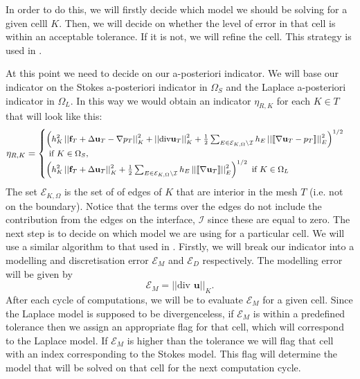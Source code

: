 \documentclass[12pt,a4paper]{article}
\theoremstyle{definition}
\begin{document}
 In order to do this, we will firstly  decide which model we should be solving for a given celll $K$.  Then, we will decide on whether the level of error in that cell is within an acceptable tolerance.  If it is not, we will refine the cell.  This strategy is used in \cite[\S6: Algorithm 6.1]{giesselmann2017posteriori}.  
 
At this point we need to decide on our a-posteriori indicator. We will base our indicator on the Stokes a-posteriori indicator in $\Omega_S$ and the Laplace a-posteriori indicator in $\Omega_L$.  In this way we would obtain an indicator $\eta_{R,K}$ for each $K\in T$ that will look like this:
\begin{equation}\small\label{approach1_indicator}
\eta_{R,K}=\begin{cases}
\left(h^2_K\left|\left|\textbf{f}_T+\Delta \textbf{u}_T-\nabla p_T\right|\right|^2_K+\left|\left|\text{div} \textbf{u}_T\right|\right|^2_K+\frac{1}{2}\sum_{E\in\mathcal{E}_{K,\Omega}\setminus\mathcal{I}}h_E\left|\left| \llbracket \nabla \textbf{u}_T -p_T \rrbracket \right|\right|_E^2\right)^{1/2} \\\text{ if }K\in\Omega_S,\\
\left(h^2_K\left|\left|\textbf{f}_T+\Delta \textbf{u}_T\right|\right|^2_K+\frac{1}{2}\sum_{E\in\mathcal{E}_{K,\Omega}\setminus\mathcal{I}}h_E\left|\left| \llbracket \nabla \textbf{u}_T  \rrbracket \right|\right|_E^2\right)^{1/2}\text{ if }K\in\Omega_L
\end{cases}
\end{equation}
The set $\mathcal{E}_{K,\Omega}$ is the set of of edges of $K$ that are interior in the mesh $T$ (i.e. not on the boundary).  Notice that the terms over the edges do not include the contribution from the edges on the interface, $\mathcal{I}$ since these are equal to zero.   The next step is to decide on which model we are using for  a particular cell.  We will use a similar algorithm to that used in \cite[\S 6: Algorithm 6.1]{giesselmann2017posteriori}.  Firstly, we will break our indicator into a modelling and discretisation error $\mathcal{E}_M$ and $\mathcal{E}_D$ respectively.   The modelling error will be given by 
\begin{equation}
\mathcal{E}_M= \left|\left|\text{div }\textbf{u}\right|\right|_K.
\end{equation}
After each cycle of computations, we will be to evaluate $\mathcal{E}_M$ for a given cell.  Since the Laplace model is supposed to be divergenceless, if $\mathcal{E}_M$ is within a predefined tolerance then we assign an appropriate flag for that cell, which will correspond to the Laplace model.  If $\mathcal{E}_M$ is higher than the tolerance we will flag that cell with an index corresponding to the Stokes model. This flag will determine the model that will be solved on that cell for the next computation cycle.  
\end{document}
